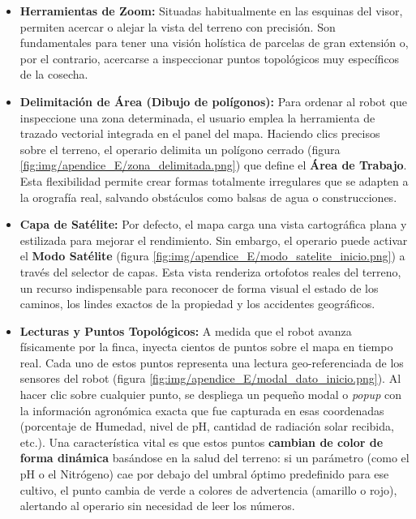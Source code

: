 \begin{itemize}
    \item \textbf{Herramientas de Zoom:} Situadas habitualmente en las esquinas del visor, permiten acercar o alejar la vista del terreno con precisión. Son fundamentales para tener una visión holística de parcelas de gran extensión o, por el contrario, acercarse a inspeccionar puntos topológicos muy específicos de la cosecha.
    
    \item \textbf{Delimitación de Área (Dibujo de polígonos):} Para ordenar al robot que inspeccione una zona determinada, el usuario emplea la herramienta de trazado vectorial integrada en el panel del mapa. Haciendo clics precisos sobre el terreno, el operario delimita un polígono cerrado (figura \ref{fig:img/apendice_E/zona_delimitada.png}) que define el \textbf{Área de Trabajo}. Esta flexibilidad permite crear formas totalmente irregulares que se adapten a la orografía real, salvando obstáculos como balsas de agua o construcciones.
    
    
    \item \textbf{Capa de Satélite:} Por defecto, el mapa carga una vista cartográfica plana y estilizada para mejorar el rendimiento. Sin embargo, el operario puede activar el \textbf{Modo Satélite} (figura \ref{fig:img/apendice_E/modo_satelite_inicio.png}) a través del selector de capas. Esta vista renderiza ortofotos reales del terreno, un recurso indispensable para reconocer de forma visual el estado de los caminos, los lindes exactos de la propiedad y los accidentes geográficos.
    
    
    \item \textbf{Lecturas y Puntos Topológicos:} A medida que el robot avanza físicamente por la finca, inyecta cientos de puntos sobre el mapa en tiempo real. Cada uno de estos puntos representa una lectura geo-referenciada de los sensores del robot (figura \ref{fig:img/apendice_E/modal_dato_inicio.png}). Al hacer clic sobre cualquier punto, se despliega un pequeño modal o \textit{popup} con la información agronómica exacta que fue capturada en esas coordenadas (porcentaje de Humedad, nivel de pH, cantidad de radiación solar recibida, etc.). Una característica vital es que estos puntos \textbf{cambian de color de forma dinámica} basándose en la salud del terreno: si un parámetro (como el pH o el Nitrógeno) cae por debajo del umbral óptimo predefinido para ese cultivo, el punto cambia de verde a colores de advertencia (amarillo o rojo), alertando al operario sin necesidad de leer los números.
    

\end{itemize}
